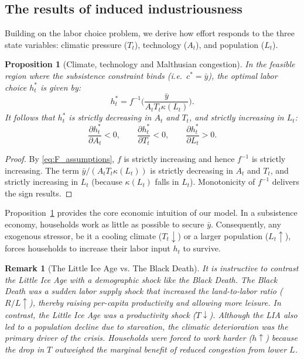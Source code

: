 \documentclass[11pt,a4paper]{article}
\newtheorem{remark}{Remark}
\newtheorem{prop}{Proposition}
\begin{document}
\subsection*{The results of induced industriousness}

Building on the labor choice problem, we derive how effort responds to the three state variables: climatic pressure (\(T_t\)), technology (\(A_t\)), and population (\(L_t\)).

\begin{prop}[Climate, technology and Malthusian congestion]
  \label{prop:CS}
  In the feasible region where the subsistence constraint binds (i.e.\ \(c^* = \bar y\)), the optimal labor choice \(h_t^*\) is given by:
  \begin{equation}
    h_t^* = f^{-1}\!\Bigg(\frac{\bar y}{A_t T_t \kappa(L_t)}\Bigg).
    \label{eq:h_star_closed}
  \end{equation}
  It follows that \(h_t^*\) is strictly decreasing in \(A_t\) and \(T_t\), and strictly increasing in \(L_t\):
  \[
    \frac{\partial h_t^*}{\partial A_t} < 0,
    \qquad
    \frac{\partial h_t^*}{\partial T_t} < 0,
    \qquad
    \frac{\partial h_t^*}{\partial L_t} > 0.
  \]
\end{prop}

\begin{proof}
  By \eqref{eq:F_assumptions}, \(f\) is strictly increasing and hence \(f^{-1}\) is strictly increasing. The term \(\bar y/(A_t T_t \kappa(L_t))\) is strictly decreasing in \(A_t\) and \(T_t\), and strictly increasing in \(L_t\) (because \(\kappa(L_t)\) falls in \(L_t\)). Monotonicity of \(f^{-1}\) delivers the sign results.
\end{proof}

Proposition~\ref{prop:CS} provides the core economic intuition of our model. In a subsistence economy, households work as little as possible to secure \(\bar y\). Consequently, any exogenous stressor, be it a cooling climate (\(T_t \downarrow\)) or a larger population (\(L_t \uparrow\)), forces households to increase their labor input \(h_t\) to survive.

\begin{remark}[The Little Ice Age vs. The Black Death]
  \label{rem:LIA_vs_BD}
  It is instructive to contrast the Little Ice Age with a demographic shock like the Black Death. The Black Death was a sudden labor supply shock that increased the land-to-labor ratio (\(R/L \uparrow\)), thereby raising per-capita productivity and allowing more leisure. In contrast, the Little Ice Age was a productivity shock (\(T \downarrow\)). Although the LIA also led to a population decline due to starvation, the climatic deterioration was the primary driver of the crisis. Households were forced to work harder (\(h \uparrow\)) because the drop in \(T\) outweighed the marginal benefit of reduced congestion from lower \(L\). 
\end{remark}
\end{document}
